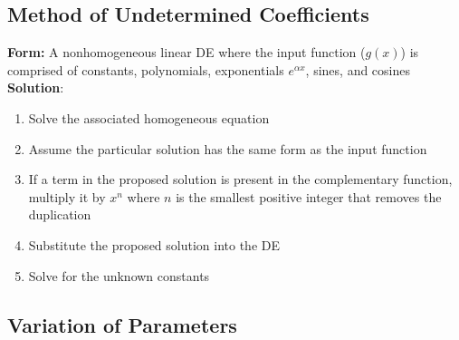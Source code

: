\documentclass{article}
\begin{document}
\subsection{Method of Undetermined Coefficients}

\textbf{Form:} A nonhomogeneous linear DE where the input function ($g(x)$) is comprised of constants, polynomials, exponentials $e^{\alpha x}$, sines, and cosines \\ \textbf{Solution}: \begin{enumerate}
  \item Solve the associated homogeneous equation

  \item Assume the particular solution has the same form as the input function

  \item If a term in the proposed solution is present in the complementary function, multiply it by $x^n$ where $n$ is the smallest positive integer that removes the duplication

  \item Substitute the proposed solution into the DE

  \item Solve for the unknown constants
\end{enumerate}

\subsection{Variation of Parameters}
\end{document}
